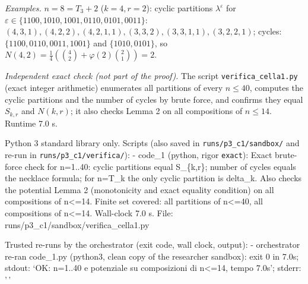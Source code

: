 \emph{Examples.} \(n=8=T_3+2\) (\(k=4,r=2\)): cyclic partitions
\(\lambda^\varepsilon\) for
\(\varepsilon\in\{1100,1010,1001,0110,0101,0011\}\):
\((4,3,1),(4,2,2),(4,2,1,1),(3,3,2),(3,3,1,1),(3,2,2,1)\); cycles:
\(\{1100,0110,0011,1001\}\) and \(\{1010,0101\}\), so
\(N(4,2)=\frac14(\binom42+\varphi(2)\binom21)=2\).

\emph{Independent exact check (not part of the proof).} The script
\texttt{verifica\_cella1.py} (exact integer arithmetic) enumerates all
partitions of every \(n\le40\), computes the cyclic partitions and the
number of cycles by brute force, and confirms they equal \(S_{k,r}\) and
\(N(k,r)\); it also checks Lemma 2 on all compositions of \(n\le14\).
Runtime 7.0 s.


Python 3 standard library only. Scripts (also saved in
\texttt{runs/p3\_c1/sandbox/} and re-run in
\texttt{runs/p3\_c1/verifica/}): - code\_1 (python, rigor
\texttt{exact}): Exact brute-force check for n=1..40: cyclic partitions
equal S\_\{k,r\}; number of cycles equals the necklace formula; for
n=T\_k the only cyclic partition is delta\_k. Also checks the potential
Lemma 2 (monotonicity and exact equality condition) on all compositions
of n\textless=14. Finite set covered: all partitions of n\textless=40,
all compositions of n\textless=14. Wall-clock 7.0 s. File:
runs/p3\_c1/sandbox/verifica\_cella1.py

Trusted re-runs by the orchestrator (exit code, wall clock, output): -
orchestrator re-ran code\_1.py (python3, clean copy of the researcher
sandbox): exit 0 in 7.0s; stdout: `OK: n=1..40 e potenziale su
composizioni di n\textless=14, tempo 7.0s'; stderr: '\,'


